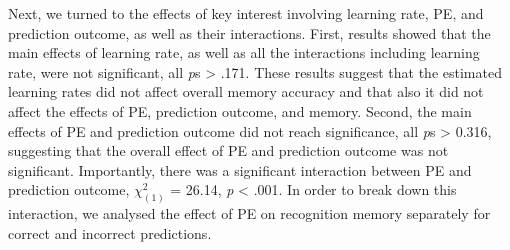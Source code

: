\documentclass[a4paper,12pt]{article}
\begin{document}
  Next, we turned to the effects of key interest involving learning rate, PE, and prediction outcome, as well as their interactions. First, results showed that the main effects of learning rate, as well as all the interactions including learning rate, were not significant, all \textit{p}s > .171. These results suggest that the estimated learning rates did not affect overall memory accuracy and that also it did not affect the effects of PE, prediction outcome, and memory. Second, the main effects of PE and prediction outcome did not reach significance, all \textit{p}s > 0.316, suggesting that the overall effect of PE and prediction outcome was not significant. Importantly, there was a significant interaction between PE and prediction outcome, $\chi^2_{(1)}$ = 26.14, \textit{p} < .001. In order to break down this interaction, we analysed the effect of PE on recognition memory separately for correct and incorrect predictions. 
\end{document}
